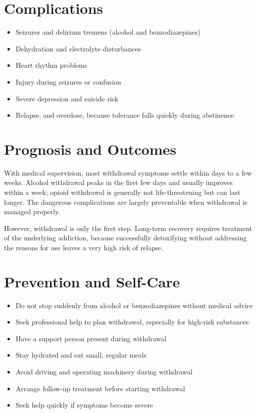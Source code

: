 \section*{Complications}
\begin{itemize}
    \item Seizures and delirium tremens (alcohol and benzodiazepines)
    \item Dehydration and electrolyte disturbances
    \item Heart rhythm problems
    \item Injury during seizures or confusion
    \item Severe depression and suicide risk
    \item Relapse, and overdose, because tolerance falls quickly during abstinence
\end{itemize}

\section*{Prognosis and Outcomes}
With medical supervision, most withdrawal symptoms settle within days to a few weeks. Alcohol withdrawal peaks in the first few days and usually improves within a week; opioid withdrawal is generally not life-threatening but can last longer. The dangerous complications are largely preventable when withdrawal is managed properly.

However, withdrawal is only the first step. Long-term recovery requires treatment of the underlying addiction, because successfully detoxifying without addressing the reasons for use leaves a very high risk of relapse.

\section*{Prevention and Self-Care}
\begin{itemize}
    \item Do not stop suddenly from alcohol or benzodiazepines without medical advice
    \item Seek professional help to plan withdrawal, especially for high-risk substances
    \item Have a support person present during withdrawal
    \item Stay hydrated and eat small, regular meals
    \item Avoid driving and operating machinery during withdrawal
    \item Arrange follow-up treatment before starting withdrawal
    \item Seek help quickly if symptoms become severe
\end{itemize}

